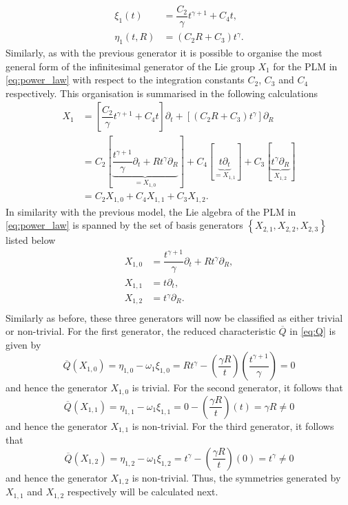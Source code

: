 \begin{align*}
\xi_1(t)&=\dfrac{C_2}{\gamma}t^{\gamma+1}+C_4t,\\
\eta_1(t,R)&=\left(C_2R+C_3\right)t^\gamma.  
\end{align*}
Similarly, as with the previous generator it is possible to organise the most general form of the infinitesimal generator of the Lie group $X_1$ for the PLM in \eqref{eq:power_law} with respect to the integration constants $C_2$, $C_3$ and $C_4$ respectively. This organisation is summarised in the following calculations
\begin{align*}
  X_1&=\left[\dfrac{C_2}{\gamma}t^{\gamma+1}+C_4t\right]\partial_t+\left[\left(C_2R+C_3\right)t^\gamma\right]\partial_R\\
     &=C_2\left[\underset{=X_{1,0}}{\underbrace{\dfrac{t^{\gamma+1}}{\gamma}\partial_t+Rt^{\gamma}\partial_R}}\right]+C_4\left[\underset{=X_{1,1}}{\underbrace{t\partial_t}}\right]+C_3\left[\underset{X_{1,2}}{\underbrace{t^{\gamma}\partial_R}}\right]\\
&=C_2X_{1,0}+C_4X_{1,1}+C_3X_{1,2}.
\end{align*}
In similarity with the previous model, the Lie algebra of the PLM in \eqref{eq:power_law} is spanned by the set of basis generators $\left\{X_{2,1},X_{2,2},X_{2,3}\right\}$ listed below
\begin{align*}
  X_{1,0}&=\dfrac{t^{\gamma+1}}{\gamma}\partial_t+Rt^{\gamma}\partial_R,\\
  X_{1,1}&=t\partial_t,\\
  X_{1,2}&=t^{\gamma}\partial_R.\\
\end{align*}
Similarly as before, these three generators will now be classified as either trivial or non-trivial. For the first generator, the reduced characteristic $\overline{Q}$ in \eqref{eq:Q} is given by
$$\overline{Q}(X_{1,0})=\eta_{1,0}-\omega_1\xi_{1,0}=Rt^{\gamma}-\left(\dfrac{\gamma R}{t}\right)\left(\dfrac{t^{\gamma+1}}{\gamma}\right)=0$$
and hence the generator $X_{1,0}$ is trivial. For the second generator, it follows that
$$\overline{Q}(X_{1,1})=\eta_{1,1}-\omega_1\xi_{1,1}=0-\left(\dfrac{\gamma R}{t}\right)\left(t\right)=\gamma R\neq 0$$
and hence the generator $X_{1,1}$ is non-trivial. For the third generator, it follows that
$$\overline{Q}(X_{1,2})=\eta_{1,2}-\omega_1\xi_{1,2}=t^{\gamma}-\left(\dfrac{\gamma R}{t}\right)\left(0\right)=t^{\gamma}\neq 0$$
and hence the generator $X_{1,2}$ is non-trivial.  Thus, the symmetries generated by $X_{1,1}$ and $X_{1,2}$ respectively will be calculated next.

